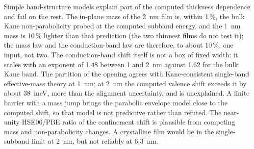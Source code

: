\begin{keyresult}
Simple band-structure models explain part of the computed thickness dependence and fail on the rest. The in-plane mass of
the 2~nm film is, within 1\,\%, the bulk Kane non-parabolicity probed at the computed subband energy, and the 1~nm mass
is 10\,\% lighter than that prediction (the two thinnest films do not test it); the mass law and the conduction-band law
are therefore, to about 10\,\%, one input, not two. The conduction-band shift itself is not a box of fixed width: it scales with an exponent of 1.48 between 1 and
2~nm against 1.62 for the bulk Kane band. The partition of the opening agrees with Kane-consistent single-band effective-mass theory at 1~nm; at 2~nm the
computed valence shift exceeds it by about 38~meV, more than the alignment uncertainty, and is unexplained. A finite
barrier with a mass jump brings the parabolic envelope model close to the computed shift, so that model is not
predictive rather than refuted. The near-unity HSE06/PBE ratio of the confinement shift is plausible from
competing mass and non-parabolicity changes. A crystalline film would be in the single-subband limit at 2~nm, but not reliably at 6.3~nm.
\end{keyresult}
